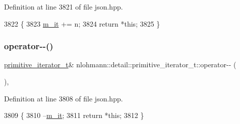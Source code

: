 Definition at line 3821 of file json.\+hpp.


\begin{DoxyCode}
3822     \{
3823         \hyperlink{classnlohmann_1_1detail_1_1primitive__iterator__t_a4357355113b0cd7e12b15c2e93703510}{m\_it} += n;
3824         \textcolor{keywordflow}{return} *\textcolor{keyword}{this};
3825     \}
\end{DoxyCode}
\mbox{\label{classnlohmann_1_1detail_1_1primitive__iterator__t_abecbf0c73c7fe963a699738065177bc3}} 
\subsubsection{\texorpdfstring{operator-\/-\/()}{operator--()}\hspace{0.1cm}{\footnotesize\ttfamily [1/2]}}
{\footnotesize\ttfamily \hyperlink{classnlohmann_1_1detail_1_1primitive__iterator__t}{primitive\+\_\+iterator\+\_\+t}\& nlohmann\+::detail\+::primitive\+\_\+iterator\+\_\+t\+::operator-\/-\/ (\begin{DoxyParamCaption}{ }\end{DoxyParamCaption})\hspace{0.3cm}{\ttfamily [inline]}, {\ttfamily [noexcept]}}



Definition at line 3808 of file json.\+hpp.


\begin{DoxyCode}
3809     \{
3810         --\hyperlink{classnlohmann_1_1detail_1_1primitive__iterator__t_a4357355113b0cd7e12b15c2e93703510}{m\_it};
3811         \textcolor{keywordflow}{return} *\textcolor{keyword}{this};
3812     \}
\end{DoxyCode}
\mbox{\label{classnlohmann_1_1detail_1_1primitive__iterator__t_aef3b5dfeb2cb04dc9d0a024fc1898b98}} 
